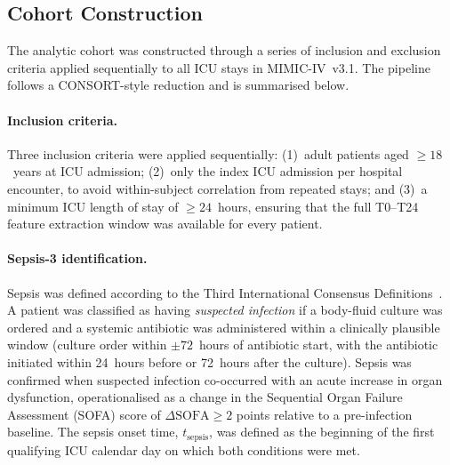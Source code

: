 \documentclass[11pt]{article}
\begin{document}
\subsection{Cohort Construction}\label{sec:cohort}

The analytic cohort was constructed through a series of inclusion and exclusion
criteria applied sequentially to all ICU stays in MIMIC-IV~v3.1.  The pipeline
follows a CONSORT-style reduction and is summarised below.

\paragraph{Inclusion criteria.}
Three inclusion criteria were applied sequentially: (1)~adult patients aged $\ge 18$~years at ICU admission; (2)~only the index ICU admission per hospital encounter, to avoid within-subject correlation from repeated stays; and (3)~a minimum ICU length of stay of $\ge 24$~hours, ensuring that the full T0--T24 feature extraction window was available for every patient.

\paragraph{Sepsis-3 identification.}
Sepsis was defined according to the Third International Consensus
Definitions~\citep{Singer2016}.  A patient was classified as having
\emph{suspected infection} if a body-fluid culture was ordered and a systemic
antibiotic was administered within a clinically plausible window (culture order
within $\pm 72$~hours of antibiotic start, with the antibiotic initiated within
24~hours before or 72~hours after the culture).  Sepsis was confirmed when
suspected infection co-occurred with an acute increase in organ dysfunction,
operationalised as a change in the Sequential Organ Failure Assessment (SOFA)
score of $\Delta\text{SOFA} \ge 2$ points relative to a pre-infection baseline.
The sepsis onset time, $t_{\text{sepsis}}$, was defined as the beginning of the
first qualifying ICU calendar day on which both conditions were met.
\end{document}
